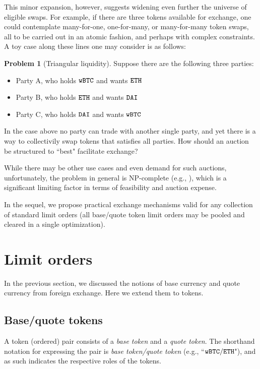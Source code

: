 \documentclass[11pt, reqno]{amsart}
\theoremstyle{definition}
\newtheorem{problem}{Problem}[subsection]
\theoremstyle{remark}
\newcommand{\BTC}{\textnormal{\texttt{wBTC}}}
\newcommand{\ETH}{\textnormal{\texttt{ETH}}}
\newcommand{\DAI}{\textnormal{\texttt{DAI}}}
\begin{document}
This minor expansion, however, suggests widening even further the universe of
eligible swaps. For example, if there are three tokens available for exchange,
one could contemplate many-for-one, one-for-many, or many-for-many token swaps,
all to be carried out in an atomic fashion, and perhaps with complex
constraints. A toy case along these lines one may consider is as follows:

\begin{problem}[Triangular liquidity]
Suppose there are the following three parties:
\begin{itemize}
    \item Party A, who holds $\BTC$ and wants $\ETH$
    \item Party B, who holds $\ETH$ and wants $\DAI$
    \item Party C, who holds $\DAI$ and wants $\BTC$
\end{itemize}

In the case above no party can trade with another single party, and yet there
is a way to collectivily swap tokens that satisfies all parties.
How should an auction be structured to ``best" facilitate exchange?
\end{problem}
While there may be other use cases and even demand for such auctions,
unfortunately, the problem in general is NP-complete (e.g., \cite{XiStWh05}),
which is a significant limiting factor in terms of feasibility and
auction expense.

In the sequel, we propose practical exchange mechanisms valid for any collection
of standard limit orders (all base/quote token limit orders may be pooled and
cleared in a single optimization).

\section{Limit orders}
In the previous section, we discussed the notions of base currency and
quote currency from foreign exchange. Here we extend them to tokens.

\subsection{Base/quote tokens}
A token (ordered) pair consists of a \emph{base token} and a
\emph{quote token}. The shorthand notation for expressing the pair is
\emph{base token/quote token} (e.g., ``$\BTC/\ETH$"), and as such indicates the
respective roles of the tokens.
\end{document}
